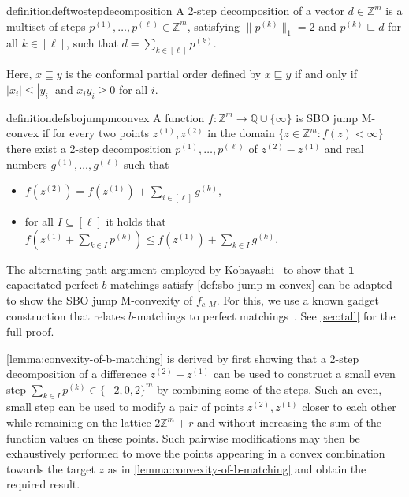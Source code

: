 \documentclass[a4paper,UKenglish,cleveref,thm-restate]{lipics-v2021}
\newcommand{\Q}{\mathbb Q}
\newcommand{\Z}{\mathbb Z}
\newcommand{\vecone}{\mathbf1}
\begin{document}
\begin{restatable}{definition}{deftwostepdecomposition}
    A $2$-step decomposition of a vector $d\in\Z^m$ is a multiset of steps $p^{(1)},\dots,p^{(\ell)}\in\Z^m$, satisfying $\|p^{(k)}\|_1=2$ and $p^{(k)}\sqsubseteq d$ for all $k\in[\ell]$, such that $d=\sum_{k\in[\ell]}p^{(k)}$.
    \label{def:2-step-decomposition}
\end{restatable}

Here, $x\sqsubseteq y$ is the conformal partial order defined by $x\sqsubseteq y$ if and only if $|x_i|\le|y_i|$ and $x_iy_i\ge0$ for all $i$.

\begin{restatable}{definition}{defsbojumpmconvex}
    A function $f\colon\Z^m\to\Q\cup\{\infty\}$ is SBO jump M-convex if for every two points $z^{(1)},z^{(2)}$ in the domain $\{z\in\Z^m:f(z)<\infty\}$ there exist a 2-step decomposition $p^{(1)},\dots,p^{(\ell)}$ of $z^{(2)}-z^{(1)}$ and real numbers $g^{(1)},\dots,g^{(\ell)}$ such that
    \begin{itemize}
        \item $f(z^{(2)})=f(z^{(1)})+\sum_{i\in[\ell]}g^{(k)}$,
        \item for all $I\subseteq[\ell]$ it holds that $f(z^{(1)}+\sum_{k\in I}p^{(k)})\le f(z^{(1)})+\sum_{k\in I}g^{(k)}$.\\
    \end{itemize}
    \label{def:sbo-jump-m-convex}
\end{restatable}

The alternating path argument employed by Kobayashi~\cite{DBLP:conf/ipco/Kobayashi23} to show that $\vecone$-capacitated perfect $b$-matchings satisfy \cref{def:sbo-jump-m-convex} can be adapted to show the SBO jump M-convexity of $f_{c,M}$. For this, we use a known gadget construction that relates $b$-matchings to perfect matchings~\cite{schrijver2003combinatorial}. See \cref{sec:tall} for the full proof.

\cref{lemma:convexity-of-b-matching} is derived by first showing that a $2$-step decomposition of a difference $z^{(2)}-z^{(1)}$ can be used to construct a small even step $\sum_{k\in I}p^{(k)}\in\{-2,0,2\}^m$ by combining some of the steps. Such an even, small step can be used to modify a pair of points $z^{(2)},z^{(1)}$ closer to each other while remaining on the lattice $2\Z^m+r$ and without increasing the sum of the function values on these points. Such pairwise modifications may then be exhaustively performed to move the points appearing in a convex combination towards the target $z$ as in \cref{lemma:convexity-of-b-matching} and obtain the required result. \iftoggle{ea}{The proof of \cref{lemma:convexity-of-b-matching} is provided in \cref{sec:lattice-convexity}.}{}
\end{document}
